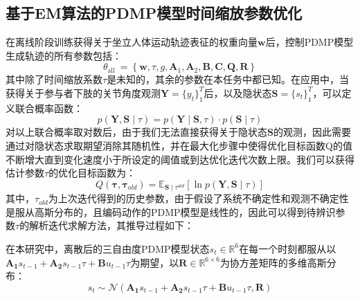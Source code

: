 \subsection{基于EM算法的PDMP模型时间缩放参数优化}
在离线阶段训练获得关于坐立人体运动轨迹表征的权重向量$\mathbf{w}$后，控制PDMP模型生成轨迹的所有参数包括：
\begin{equation}
    \theta_{\text {all }}=\left\{\mathbf{w}, \tau, g, \mathbf{A}_1, \mathbf{A}_2, \mathbf{B}, \mathbf{C}, \mathbf{Q}, \mathbf{R}\right\}
    \label{eq:4-16}
\end{equation}
其中除了时间缩放系数$\tau$是未知的，其余的参数在本任务中都已知。在应用中，当获得关于参与者下肢的关节角度观测$\mathbf{Y}=\{ y_t\}_1^T$后，以及隐状态$\mathbf{S}=\{s_t\}_1^T$，可以定义联合概率函数：
\begin{equation}
    p(\mathbf{Y}, \mathbf{S} \mid \tau) = 
    p(\mathbf{Y} \mid  \mathbf{S}, \tau) \cdot p(\mathbf{S} \mid  \tau)
    \label{eq:4-17}
\end{equation}
对以上联合概率取对数后，由于我们无法直接获得关于隐状态$\mathbf{S}$的观测，因此需要通过对隐状态求取期望消除其随机性，并在最大化步骤中使得优化目标函数Q的值不断增大直到变化速度小于所设定的阈值或到达优化迭代次数上限。我们可以获得估计参数$\tau$的优化目标函数为：
\begin{equation}
    Q\left(\boldsymbol{\tau}, \boldsymbol{\tau}_{old}\right)=\mathbb{E}_{\mathbf{S} \mid \tau^{old}}[\ln p(\mathbf{Y}, \mathbf{S} \mid \tau)]
    \label{eq:4-18}
\end{equation}
其中，$\tau_{old}$为上次迭代得到的历史参数，由于假设了系统不确定性和观测不确定性是服从高斯分布的，且编码动作的PDMP模型是线性的，因此可以得到待辨识参数$\tau$的解析迭代求解方法，其推导过程如下：

在本研究中，离散后的三自由度PDMP模型状态$s_t\in \mathbb{R}^{6}$在每一个时刻都服从以$\mathbf{A_1}s_{t-1}+\mathbf{A_2}s_{t-1}\tau+\mathbf{B}u_{t-1}\tau$为期望，以$\mathbf{R} \in \mathbb{R}^{6\times 6}$为协方差矩阵的多维高斯分布：
\begin{equation}
  s_t \sim \mathcal N(\mathbf{A_1}s_{t-1}+\mathbf{A_2}s_{t-1}\tau+\mathbf{B}u_{t-1}\tau,\mathbf{R})
  \label{eq:4-19}
\end{equation}

